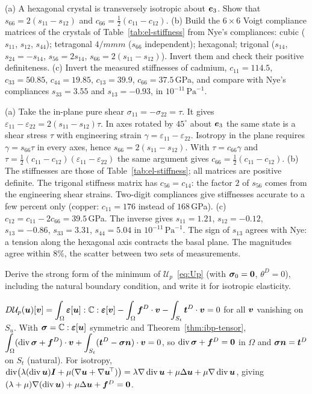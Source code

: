 \label{exo:stiffness}
%
(a) A hexagonal crystal is transversely isotropic about $\bm{e}_3$. Show that
$s_{66}=2(s_{11}-s_{12})$ and $c_{66}=\tfrac12(c_{11}-c_{12})$. (b) Build the
$6\times6$ Voigt compliance matrices of the crystals of
Table~\ref{tab:el-stiffness} from Nye's compliances: cubic ($s_{11}$,
$s_{12}$, $s_{44}$); tetragonal $4/mmm$ ($s_{66}$ independent); hexagonal;
trigonal ($s_{14}$, $s_{24}=-s_{14}$, $s_{56}=2s_{14}$,
$s_{66}=2(s_{11}-s_{12})$). Invert them and check their positive
definiteness. (c) Invert the measured stiffnesses of cadmium,
$c_{11}=114.5$, $c_{33}=50.85$, $c_{44}=19.85$, $c_{13}=39.9$,
$c_{66}=37.5$\,GPa, and compare with Nye's compliances $s_{33}=3.55$ and
$s_{13}=-0.93$, in $10^{-11}\,\mathrm{Pa}^{-1}$.
\begin{solution}
(a) Take the in-plane pure shear $\sigma_{11}=-\sigma_{22}=\tau$. It gives
$\varepsilon_{11}-\varepsilon_{22}=2(s_{11}-s_{12})\tau$. In axes rotated by
$45^\circ$ about $\bm{e}_3$ the same state is a shear stress $\tau$ with
engineering strain $\gamma=\varepsilon_{11}-\varepsilon_{22}$. Isotropy in the
plane requires $\gamma=s_{66}\tau$ in every axes, hence
$s_{66}=2(s_{11}-s_{12})$. With $\tau=c_{66}\gamma$ and
$\tau=\tfrac12(c_{11}-c_{12})(\varepsilon_{11}-\varepsilon_{22})$ the same
argument gives $c_{66}=\tfrac12(c_{11}-c_{12})$.
(b) The stiffnesses are those of Table~\ref{tab:el-stiffness}; all matrices
are positive definite. The trigonal stiffness matrix has $c_{56}=c_{14}$: the
factor $2$ of $s_{56}$ comes from the engineering shear strains. Two-digit
compliances give stiffnesses accurate to a few percent only (copper:
$c_{11}=176$ instead of $168$\,GPa).
(c) $c_{12}=c_{11}-2c_{66}=39.5$\,GPa. The inverse gives $s_{11}=1.21$,
$s_{12}=-0.12$, $s_{13}=-0.86$, $s_{33}=3.31$, $s_{44}=5.04$ in
$10^{-11}\,\mathrm{Pa}^{-1}$. The sign of $s_{13}$ agrees with Nye: a tension
along the hexagonal axis contracts the basal plane. The magnitudes agree
within $8\%$, the scatter between two sets of measurements.

\end{solution}

\label{exo:navier}
Derive the strong form of the minimum of $\mathcal U_p$~\eqref{eq:Up} (with
$\bm{\sigma}_0=\bm{0}$, $\theta^D=0$), including the natural boundary condition, and
write it for isotropic elasticity.
\begin{solution}
$\displaystyle D\mathcal U_p(\bm{u})[\bm{v}]=\int_\Omega\bm{\varepsilon}[\bm{u}]:\mathbb{C}:\bm{\varepsilon}[\bm{v}]-\int_\Omega\bm{f}^{D}\cdot\bm{v}-\int_{S_t}\bm{t}^{D}\cdot\bm{v}=0$
for all $\bm{v}$ vanishing on $S_u$. With $\bm{\sigma}=\mathbb{C}:\bm{\varepsilon}[\bm{u}]$ symmetric and
Theorem~\ref{thm:ibp-tensor},
$\displaystyle \int_\Omega(\operatorname{div}\bm{\sigma}+\bm{f}^{D})\cdot\bm{v}+\int_{S_t}(\bm{t}^{D}-\bm{\sigma}\bm{n})\cdot\bm{v}=0$, so
$\operatorname{div}\bm{\sigma}+\bm{f}^{D}=\bm{0}$ in $\Omega$ and $\bm{\sigma}\bm{n}=\bm{t}^{D}$ on $S_t$ (natural). For
isotropy, $\operatorname{div}\bigl(\lambda(\operatorname{div}\bm{u})\bm{I}+\mu(\nabla\bm{u}+\nabla\bm{u}^{\!\top})\bigr)
=\lambda\nabla\operatorname{div}\bm{u}+\mu\Delta\bm{u}+\mu\nabla\operatorname{div}\bm{u}$, giving
$(\lambda+\mu)\nabla(\operatorname{div}\bm{u})+\mu\Delta\bm{u}+\bm{f}^{D}=\bm{0}$.
\end{solution}

